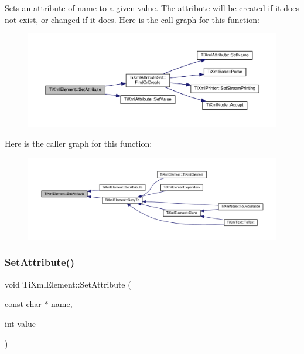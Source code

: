 Sets an attribute of name to a given value. The attribute will be created if it does not exist, or changed if it does. Here is the call graph for this function\+:\nopagebreak
\begin{figure}[H]
\begin{center}
\leavevmode
\includegraphics[width=350pt]{class_ti_xml_element_abf0b3bd7f0e4c746a89ec6e7f101fc32_cgraph}
\end{center}
\end{figure}
Here is the caller graph for this function\+:\nopagebreak
\begin{figure}[H]
\begin{center}
\leavevmode
\includegraphics[width=350pt]{class_ti_xml_element_abf0b3bd7f0e4c746a89ec6e7f101fc32_icgraph}
\end{center}
\end{figure}
\mbox{\label{class_ti_xml_element_ace6f4be75e373726d4774073d666d1a7}} 
\subsubsection{\texorpdfstring{Set\+Attribute()}{SetAttribute()}\hspace{0.1cm}{\footnotesize\ttfamily [2/2]}}
{\footnotesize\ttfamily void Ti\+Xml\+Element\+::\+Set\+Attribute (\begin{DoxyParamCaption}\item[{const char $\ast$}]{name,  }\item[{int}]{value }\end{DoxyParamCaption})}

